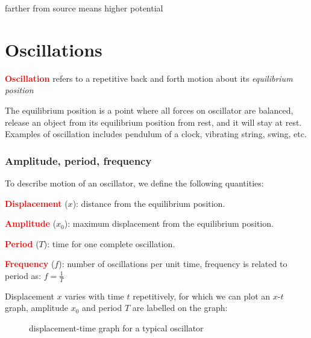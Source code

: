 \documentclass[a4paper,12pt]{book}
\newenvironment{ilight}
  {\centering
  	\vspace*{6pt}
  	\begin{tcolorbox}[colframe=Gray,colback=LightGrey!15]
  \setlength{\baselineskip}{\baselineskip}%
  }
  {\end{tcolorbox}\vspace*{-4pt}}
\newcommand{\keypoint}[1]{\textbf{\textcolor{red}{#1}}}
\newcommand{\keypoint}[1]{\textbf{\textcolor{red}{#1}}}
\begin{document}
farther from source means higher potential

\cleardoublepage

\chapter{Oscillations}
\begin{ilight}
	\keypoint{Oscillation} refers to a repetitive back and forth motion about its \emph{equilibrium position}
\end{ilight}

The equilibrium position is a point where all forces on oscillator are balanced, release an object from its equilibrium position from rest, and it will stay at rest. Examples of oscillation includes pendulum of a clock, vibrating string, swing, etc.

\subsection{Amplitude, period, frequency}

To describe motion of an oscillator, we define the following quantities:

\keypoint{Displacement} ($x$): distance from the equilibrium position.

\keypoint{Amplitude} ($x_0$): maximum displacement from the equilibrium position.

\keypoint{Period} ($T$): time for one complete oscillation.

\keypoint{Frequency} ($f$): number of oscillations per unit time, frequency is related to period as: ${f=\frac{1}{T}}$

\vspace*{\baselineskip}

Displacement $x$ varies with time $t$ repetitively, for which we can plot an $x$-$t$ graph, amplitude $x_0$ and period $T$ are labelled on the graph:

\begin{figure}[ht]
\centering
{}

\caption{displacement-time graph for a typical oscillator}
\end{figure}
\end{document}
